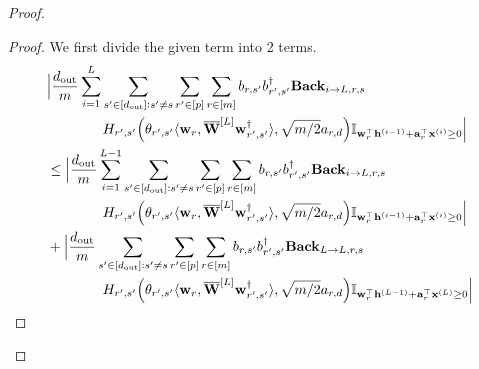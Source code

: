 \begin{claim}
\begin{proof}
				
				\iffalse
				\begin{proof}
					We first divide the given term into 2 terms.
					\begingroup
					\allowdisplaybreaks
					\begin{align}
						&\Big|\frac{d_{\mathrm{out}} }{m} \sum_{i=1}^{L}  \sum_{s' \in [d_{\mathrm{out}} ]: s' \ne s} \sum_{r' \in [p]} \sum_{r \in [m]}  b_{r, s'} b_{r', s'}^{\dagger} \mathbf{Back}_{i \to L, r, s} \nonumber\\& \quad \quad \quad \quad H_{r', s'}\Big(\theta_{r', s'} \langle \mathbf{w}_{r}, \overline{\mathbf{W}}^{[L]} \mathbf{w}_{r', s'}^{\dagger}\rangle , \sqrt{m/2} a_{r, d}\Big) \mathbb{I}_{\mathbf{w}_r^{\top} \mathbf{h}^{(i-1)} + \mathbf{a}_r^{\top} \mathbf{x}^{(i)} \ge 0}\Big| \nonumber\\&
						\le \Big|\frac{d_{\mathrm{out}} }{m} \sum_{i=1}^{L-1}  \sum_{s' \in [d_{\mathrm{out}} ]: s' \ne s} \sum_{r' \in [p]} \sum_{r \in [m]}  b_{r, s'} b_{r', s'}^{\dagger} \mathbf{Back}_{i \to L, r, s} \nonumber\\& \quad \quad \quad \quad H_{r', s'}\Big(\theta_{r', s'} \langle \mathbf{w}_{r}, \overline{\mathbf{W}}^{[L]} \mathbf{w}_{r', s'}^{\dagger}\rangle , \sqrt{m/2} a_{r, d}\Big) \mathbb{I}_{\mathbf{w}_r^{\top} \mathbf{h}^{(i-1)} + \mathbf{a}_r^{\top} \mathbf{x}^{(i)} \ge 0}\Big|\label{eq:UpuntilL-1}\\&
						+ \Big|\frac{d_{\mathrm{out}} }{m}  \sum_{s' \in [d_{\mathrm{out}} ]: s' \ne s} \sum_{r' \in [p]} \sum_{r \in [m]}  b_{r, s'} b_{r', s'}^{\dagger} \mathbf{Back}_{L \to L, r, s} \nonumber\\& \quad \quad \quad \quad H_{r', s'}\Big(\theta_{r', s'} \langle \mathbf{w}_{r}, \overline{\mathbf{W}}^{[L]} \mathbf{w}_{r', s'}^{\dagger}\rangle , \sqrt{m/2} a_{r, d}\Big) \mathbb{I}_{\mathbf{w}_r^{\top} \mathbf{h}^{(L-1)} + \mathbf{a}_r^{\top} \mathbf{x}^{(L)} \ge 0}\Big|\label{eq:equal2L}
					\end{align}
					\endgroup
					

\end{proof}
\end{proof}
\end{claim}

